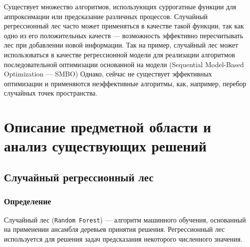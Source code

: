 \documentclass[pscyr,specification,annotation]{itmo-student-thesis}
\begin{document}





\tableofcontents

\prefacepage{}

Существует множество алгоритмов, использующих суррогатные функции для
аппроксимации или предсказание различных процессов. Случайный регрессионный лес
часто может применяться в качестве такой функции, так как одно из его
положительных качеств --- возможность эффективно пересчитывать лес при
добавлении новой информации. Так на пример, случайный лес может использоваться
в качестве регрессионной модели для реализации алгоритмов последовательной
оптимизации основанной на модели (Sequential Model-Based Optimization --- SMBO)
Однако, сейчас не существует эффективных оптимизации и применяются неэффективные
алгоритмы, как, например, перебор случайных точек пространства.

\chapter{Описание предметной области и анализ существующих решений}

\section{Случайный регрессионный лес}\label{sec:random_forest}
\subsection{Определение}
Случайный лес (\texttt{Random Forest}) --- алгоритм машинного обучения,
основанный на применении ансамбля деревьев принятия решения. Регрессионный лес
используется для решения задач предсказания некоторого численного значения.
\end{document}
